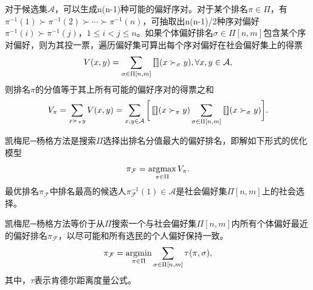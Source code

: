 \begin{definition}[排名分值]
对于候选集$\mathcal A$，可以生成n(n-1)种可能的偏好序对。对于某个排名$\pi\in \Pi$，有$\pi^{-1}(1)\succ \pi^{-1}(2)\succ\cdots \succ \pi^{-1}(n)$，可抽取出n(n-1)/2种序对偏好$\pi^{-1}(i)\succ \pi^{-1}(j)$，$1\le i<j \le n$。如果个体偏好排名$\sigma\in \Pi[n,m]$包含某个序对偏好，则为其投一票，遍历偏好集可算出每个序对偏好在社会偏好集上的得票
\begin{equation}
    V(x, y) = \sum\limits_{\sigma\in \Pi[n,m]} \operatorname{[\![]\!]}(x\succ_\sigma y), \forall x, y\in \mathcal A,
\end{equation}
则排名$\pi$的分值等于其上所有可能的偏好序对的得票之和
\begin{equation}
    V_\pi = \sum\limits_{x\succ_\pi y} V(x,y) = \sum\limits_{x,y\in \mathcal A} \bigg[\operatorname{[\![]\!]}(x\succ_\pi y) \sum\limits_{\sigma\in \Pi[n,m]} \operatorname{[\![]\!]}(x\succ_\sigma y)\bigg].
\end{equation}
\end{definition}

\begin{definition}
凯梅尼─杨格方法是搜索$\Pi$选择出排名分值最大的偏好排名，即解如下形式的优化模型
\begin{equation}\label{eq:kemeny-youngmethod}
    \pi_\mathcal F = \operatorname*{\mathrm{\arg\!\max}}\limits_{\pi\in \Pi} V_\pi.
\end{equation}
最优排名$\pi_\mathcal F$中排名最高的候选人$\pi_\mathcal F^{-1}(1)\in \mathcal A$是社会偏好集$\Pi[n,m]$上的社会选择。
\end{definition}

\begin{theorem}\label{th:kemeny-young-borda}
凯梅尼─杨格方法等价于从$\Pi$搜索一个与社会偏好集$\Pi[n,m]$内所有个体偏好最近的偏好排名$\pi_\mathcal F$，以尽可能和所有选民的个人偏好保持一致。
\begin{equation}\label{eq:kemeny-young-borda}
    \pi_\mathcal F = \operatorname*{\mathrm{\arg\!\min}}\limits_{\pi\in \Pi} \sum\limits_{\sigma \in \Pi[n,m]} \tau(\pi,\sigma),
\end{equation}
其中，$\tau$表示肯德尔距离度量公式。
\end{theorem}

